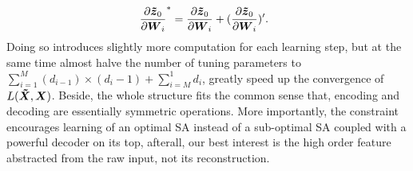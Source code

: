 \begin{equation*}
  \begin{split}\
    \frac{\partial \boldsymbol{\tilde{z}}_0}{\partial \boldsymbol{W}_i}^* &= \frac{\partial \boldsymbol{\tilde{z}}_0}{\partial \boldsymbol{W}_i} + (\frac{\partial \boldsymbol{\tilde{z}}_0}{\partial \boldsymbol{W}_i})^\prime.
  \end{split}
\end{equation*}
Doing so introduces slightly more computation for each learning step, but at the same time almost halve the number of tuning parameters to $\sum_{i=1}^{M}{(d_{i-1}) \times (d_i - 1)} + \sum_{i=M}^{1}{d_i}$, greatly speed up the convergence of $L(\boldsymbol{\tilde{X}}, \boldsymbol{X})$.  Beside, the whole structure fits the common sense that, encoding and decoding are essentially symmetric operations. More importantly, the constraint encourages learning of an optimal SA instead of a sub-optimal SA coupled with a powerful decoder on its top, afterall, our best interest is the high order feature abstracted from the raw input, not its reconstruction.

